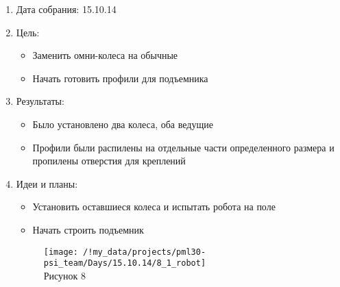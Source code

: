 
	\begin{enumerate}
	\item Дата собрания: 15.10.14
	\item Цель:
		\begin{itemize}
		\item Заменить омни-колеса на обычные
		\item Начать готовить профили для подъемника
		\end{itemize}
	\item Результаты:
		\begin{itemize}
		\item Было установлено два колеса, оба ведущие
		\item Профили были распилены на отдельные части определенного размера и пропилены отверстия для креплений
		\end{itemize}
	\item Идеи и планы:
		\begin{itemize}
		\item Установить оставшиеся колеса и испытать робота на поле
		\item Начать строить подъемник
		\end{itemize}
		\begin{figure} [h]
			\centering
			\begin{minipage}{0.3\linewidth}
				\texttt{[image: /!my\_data/projects/pml30-psi\_team/Days/15.10.14/8\_1\_robot]}\\ Рисунок 8
			\end{minipage}
		\end{figure}
	\end{enumerate}
\newpage
	
